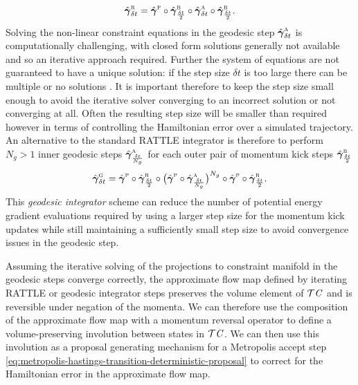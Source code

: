 \begin{equation}\label{eq:rattle-step-alt}
  \hat{\boldsymbol{\gamma}}^{\textsc{r}}_{\delta t} =
  \hat{\boldsymbol{\gamma}}^{\textsc{p}} \circ
  \hat{\boldsymbol{\gamma}}^{\textsc{b}}_{\frac{\delta t}{2}} \circ
  \hat{\boldsymbol{\gamma}}_{\delta t}^{\textsc{a}} \circ
  \hat{\boldsymbol{\gamma}}^{\textsc{b}}_{\frac{\delta t}{2}}.
\end{equation}
Solving the non-linear constraint equations in the geodesic step $\hat{\boldsymbol{\gamma}}_{\delta t}^{\textsc{a}}$ is computationally challenging, with closed form solutions generally not available and so an iterative approach required. Further the system of equations are not guaranteed to have a unique solution: if the step size $\delta t$ is too large there can be multiple or no solutions \citep{leimkuhler2004simulating}. It is important therefore to keep the step size small enough to avoid the iterative solver converging to an incorrect solution or not converging at all. Often the resulting step size will be smaller than required however in terms of controlling the Hamiltonian error over a simulated trajectory. An alternative to the standard RATTLE integrator is therefore to perform $N_g > 1$ inner geodesic steps $\hat{\boldsymbol{\gamma}}_{\frac{\delta t}{N_g}}^{\textsc{a}}$ for each outer pair of momentum kick steps $\hat{\boldsymbol{\gamma}}^{\textsc{b}}_{\frac{\delta t}{2}}$
\begin{equation}\label{eq:geodesic-integrator-step}
  \hat{\boldsymbol{\gamma}}^{\textsc{g}}_{\delta t} =
  \hat{\boldsymbol{\gamma}}^{\textsc{p}} \circ
  \hat{\boldsymbol{\gamma}}^{\textsc{b}}_{\frac{\delta t}{2}} \circ
  \big(
  \hat{\boldsymbol{\gamma}}^{\textsc{p}} \circ
  \hat{\boldsymbol{\gamma}}_{\frac{\delta t}{N_g}}^{\textsc{a}}
  \big)^{N_g} \circ
  \hat{\boldsymbol{\gamma}}^{\textsc{p}} \circ
  \hat{\boldsymbol{\gamma}}^{\textsc{b}}_{\frac{\delta t}{2}}.
\end{equation}
This \emph{geodesic integrator} \citep{leimkuhler1996symplectic,leimkuhler2016efficient} scheme can reduce the number of potential energy gradient evaluations required by using a larger step size for the momentum kick updates while still maintaining a sufficiently small step size to avoid convergence issues in the geodesic step. %

Assuming the iterative solving of the projections to constraint manifold in the geodesic steps converge correctly, the approximate flow map defined by iterating RATTLE or geodesic integrator steps preserves the volume element of $\mathcal{T}\mathit{C}$ and is reversible under negation of the momenta. We can therefore use the composition of the approximate flow map with a momentum reversal operator to define a volume-preserving involution between states in $\mathcal{T}\mathit{C}$. We can then use this involution as a proposal generating mechanism for a Metropolis accept step \eqref{eq:metropolis-hastings-transition-deterministic-proposal} to correct for the Hamiltonian error in the approximate flow map. 

